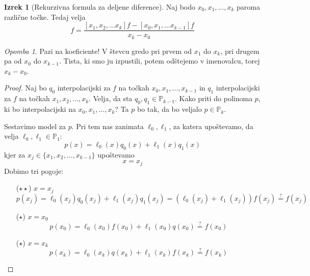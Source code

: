 \documentclass[a4paper,12pt]{article}
\theoremstyle{definition}
\newtheorem{theorem}[counter]{Izrek}
\theoremstyle{remark}
\newtheorem*{rem}{Opomba}
\newcommand{\Pp}{\mathbb{P}}
\begin{document}
\begin{theorem}[Rekurzivna formula za deljene diference]
    Naj bodo $x_0, x_1, \dots, x_k$ paroma različne točke. Tedaj velja
    \begin{equation*}
        [x_0, x_1, \dots, x_k]f = \frac{[x_1, x_2, \dots x_k] f - [x_0, x_1, \dots x_{k-1}]f}{x_k - x_0}
    \end{equation*}
\end{theorem}

\begin{rem}
    Pazi na koeficiente! V števcu gredo pri prvem od $x_1$ do $x_k$, pri drugem pa od $x_0$ do $x_{k-1}$. Tista, ki smo ju izpustili,
    potem odštejemo v imenovalcu, torej $x_k-x_0$.
\end{rem}

\begin{proof}
    Naj bo $q_0$ interpolacijski za $f$ na točkah $x_0, x_1, \dots, x_{k-1}$ in $q_1$ interpolacijski za $f$ na točkah $x_1, x_2, \dots, x_k$.
    Velja, da sta $q_0, q_1 \in \Pp_{k-1}$.
    Kako priti do polinoma $p$, ki bo interpolacijski na $x_0, x_1, \dots, x_k$? Ta $p$ bo tak, da bo veljalo $p \in \Pp_k$.

    Sestavimo model za $p$. Pri tem nas zanimata $\ell_0, \ell_1$, za katera upoštevamo, da velja $\ell_0, \ell_1 \in \Pp_1$:
    \begin{equation*}
        p(x) = \ell_0(x) q_0(x) + \ell_1(x) q_1(x)
    \end{equation*}
    kjer za $x_j \in \{x_1, x_2, \dots, x_{k-1}\}$ upoštevamo
    \begin{equation*}
        x = x_j
    \end{equation*}
    Dobimo tri pogoje:
    \begin{itemize}

        \item[($\star \star$)] $x = x_j$
        \begin{equation*}
            p(x_j) = \ell_0(x_j) q_0 (x_j) + \ell_1 (x_j) q_1 (x_j) = (\ell_0 (x_j) + \ell_1 (x_j)) f(x_j) \stackrel{\text{?}}{=} f(x_j)
        \end{equation*}

        \item[($\star$)] $x = x_0$
        \begin{equation*}
            p(x_0) = \ell_0(x_0) f(x_0) + \ell_1 (x_0) q(x_0) \stackrel{\text{?}}{=} f(x_0)
        \end{equation*}

        \item[($\star$)] $x = x_k$
        \begin{equation*}
            p(x_k) = \ell_0 (x_k) q(x_k) + \ell_1(x_k) f(x_k) \stackrel{\text{?}}{=} f(x_k)
        \end{equation*}


\end{itemize}
\end{proof}
\end{document}
